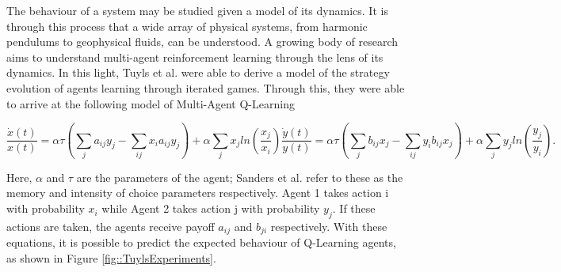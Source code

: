 \documentclass[.../main.tex]{subfiles}
\begin{document}
    The behaviour of a system may be studied given a model of its
    dynamics. It is through this process that a wide array of physical
    systems, from harmonic pendulums to geophysical fluids, can be
    understood. A growing body of research aims to understand
    multi-agent reinforcement learning through the lens of its
    dynamics. In this light, Tuyls et al. \cite{Tuyls2006AnGames} were
    able to derive a model of the strategy evolution of agents
    learning through iterated games.  Through this, they were able to
    arrive at the following model of Multi-Agent Q-Learning

	\begin{subequations}
	\label{eqn::EOM}
		\begin{equation}
			\frac{\dot{x}(t)}{x(t)} = \alpha \tau (\sum_{j} a_{ij} y_j - \sum_{i j} x_i a_{ij} y_j)
			+ \alpha \sum_j x_j ln(\frac{x_j}{x_i}) 
		\end{equation}
		\begin{equation}
			\frac{\dot{y}(t)}{y(t)} = \alpha \tau (\sum_{j} b_{ij} x_j - \sum_{i j} y_i b_{ij} x_j)
			+ \alpha \sum_j y_j ln(\frac{y_j}{y_i}).
		\end{equation}
	\end{subequations}


	Here, $\alpha$ and $\tau$ are the parameters of the agent;
        Sanders et al. refer to these as the memory and intensity of
        choice parameters respectively. Agent 1 takes action i with
        probability $x_i$ while Agent 2 takes action j with
        probability $y_j$. If these actions are taken, the agents
        receive payoff $a_{ij}$ and $b_{ji}$ respectively. With these
        equations, it is possible to predict the expected behaviour of
        Q-Learning agents, as shown in Figure
        \ref{fig::TuylsExperiments}.
\end{document}
